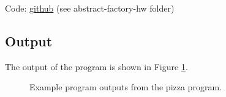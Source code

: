 Code: \href{https://github.com/dyc3/ssw345-group-assignments}{github} (see abstract-factory-hw folder)

\subsection{Output}

The output of the program is shown in Figure \ref{Figure::pizzaoutput}.

\begin{figure}[hp!]
  \centering
  \caption{\label{Figure::pizzaoutput} Example program outputs from the pizza program.}
\end{figure}